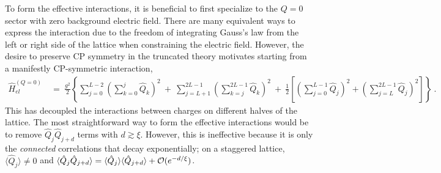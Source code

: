\documentclass[aps, prc, tightenlines,superscriptaddress, letterpaper, amsmath, amssymb, preprintnumbers, floatfix, longbibliography, nofootinbib]{revtex4-2}
\begin{document}
To form the effective interactions, it is beneficial to first specialize to the $Q=0$ sector with zero background electric field.
There are many equivalent ways to express the interaction due to the freedom of integrating Gauss's law from the left or right side of the lattice 
when constraining the electric field.
However, the desire to preserve CP symmetry in the truncated theory motivates starting from a manifestly CP-symmetric interaction,
%
\begin{align}
\hat{H}_{el}^{(Q=0)} \ &= \ \frac{g^2}{2} \left \{\sum_{j=0}^{L-2}\left ( \sum_{k=0}^j \hat{Q}_k\right )^2\ + \ \sum_{j=L+1}^{2L-1}\left ( \sum_{k=j}^{2L-1} \hat{Q}_k\right )^2 \ + \ \frac{1}{2}\left [\left (\sum_{j=0}^{L-1} \hat{Q}_j \right )^2 + \left (\sum_{j=L}^{2L-1} \hat{Q}_j \right )^2 \right ] \right \}
\ .
\label{eq:HelCP}
\end{align}
%
This has decoupled the interactions between charges on different halves of the lattice.
The most straightforward way to form the effective interactions would be to remove $\hat{Q}_j \hat{Q}_{j+d}$ terms with $d\gtrsim \xi$.
However, this is ineffective because it is only the {\it connected} correlations that decay exponentially; on a staggered lattice, $\langle \hat{Q}_j \rangle \neq 0$ and $\langle \hat{Q}_j \hat{Q}_{j+d}\rangle = \langle \hat{Q}_j \rangle \langle \hat{Q}_{j+d} \rangle + {\cal O}(e^{-d/\xi})$.
\end{document}
